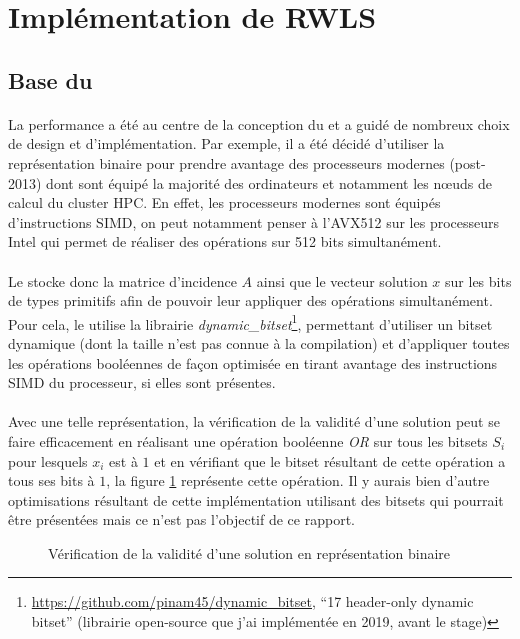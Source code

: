\documentclass[a4paper,11pt,twoside,french,report]{../common/simplem}
\begin{document}
		\section{Implémentation de \acrshort{RWLS}}\label{sec:impl_RWLS}
			\subsection{Base du \solver{}}
				\paragraph*{}
					La performance a été au centre de la conception du \solver{} et a guidé de nombreux choix de design et d'implémentation. Par exemple, il a été décidé d'utiliser la représentation binaire pour prendre avantage des processeurs modernes (post-2013) dont sont équipé la majorité des ordinateurs et notamment les nœuds de calcul du cluster \gls{HPC}. En effet, les processeurs modernes sont équipés d'instructions \gls{SIMD}, on peut notamment penser à l'AVX512 sur les processeurs Intel qui permet de réaliser des opérations sur 512 bits simultanément.
				\paragraph*{}
					Le \solver{} stocke donc la matrice d'incidence \(A\) ainsi que le vecteur solution \(x\) sur les bits de types primitifs \Cpp{} afin de pouvoir leur appliquer des opérations simultanément. Pour cela, le \solver{} utilise la librairie \textit{dynamic\_bitset}\footnote{\url{https://github.com/pinam45/dynamic_bitset}, ``\Cpp{}17 header-only dynamic bitset'' (librairie open-source que j'ai implémentée en 2019, avant le stage)}, permettant d'utiliser un bitset dynamique (dont la taille n'est pas connue à la compilation) et d'appliquer toutes les opérations booléennes de façon optimisée en tirant avantage des instructions \gls{SIMD} du processeur, si elles sont présentes.
				\paragraph*{}
					Avec une telle représentation, la vérification de la validité d'une solution peut se faire efficacement en réalisant une opération booléenne \textit{OR} sur tous les bitsets \(S_i\) pour lesquels \(x_i\) est à \(1\) et en vérifiant que le bitset résultant de cette opération a tous ses bits à \(1\), la figure \ref{fig:binary_representation_solution_check} représente cette opération. Il y aurais bien d'autre optimisations résultant de cette implémentation utilisant des bitsets qui pourrait être présentées mais ce n'est pas l'objectif de ce rapport.
				\begin{figure}[H]
					\centering%
					\resizebox{\textwidth}{!}{}%
					\caption{Vérification de la validité d'une solution en représentation binaire}%
					\label{fig:binary_representation_solution_check}%
				\end{figure}
\end{document}
